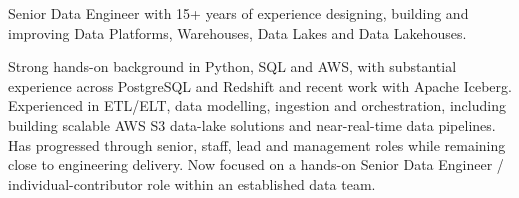 

\begin{cvparagraph}

Senior Data Engineer with 15+ years of experience designing, building and improving Data Platforms, Warehouses, Data Lakes and Data Lakehouses.

Strong hands-on background in Python, SQL and AWS, with substantial experience across PostgreSQL and Redshift and recent work with Apache Iceberg. Experienced in ETL/ELT, data modelling, ingestion and orchestration, including building scalable AWS S3 data-lake solutions and near-real-time data pipelines. Has progressed through senior, staff, lead and management roles while remaining close to engineering delivery. Now focused on a hands-on Senior Data Engineer / individual-contributor role within an established data team.
\end{cvparagraph}
